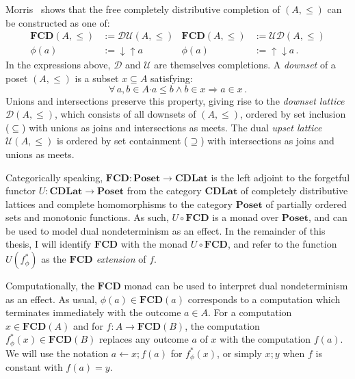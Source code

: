 \documentclass[draft,11pt]{report}
\newcommand{\bdot}{\boldsymbol{\cdot}}
\begin{document}
Morris~\citep{augtyp} shows that
the free completely distributive completion of $(A, \le)$
can be constructed as one of:
\begin{align*}
  \mathbf{FCD}(A, {\le}) &:= \mathcal{D} \mathcal{U}(A, {\le}) &
  \mathbf{FCD}(A, {\le}) &:= \mathcal{U} \mathcal{D}(A, {\le}) \\
  \phi(a) &:= {\downarrow}{\uparrow} a &
  \phi(a) &:= {\uparrow}{\downarrow} a \,.
\end{align*}
In the expressions above,
$\mathcal{D}$ and $\mathcal{U}$
are themselves completions.
A \emph{downset} of a poset $(A, {\le})$
is a subset $x \subseteq A$ satisfying:
\[
  \forall \, a, b \in A \bdot
          a \le b \wedge b \in x \Rightarrow a \in x \,.
\]
Unions and intersections preserve this property,
giving rise to the \emph{downset lattice} $\mathcal{D}(A, {\le})$,
which consists of all downsets of $(A, {\le})$,
ordered by set inclusion (${\subseteq}$) with
unions as joins and intersections as meets.
The dual \emph{upset lattice} $\mathcal{U}(A, {\le})$
is ordered by set containment (${\supseteq}$) with
intersections as joins and unions as meets.

Categorically speaking,
$\mathbf{FCD} : \mathbf{Poset} \rightarrow \mathbf{CDLat}$
is the left adjoint to the forgetful functor
$U : \mathbf{CDLat} \rightarrow \mathbf{Poset}$
from the category $\mathbf{CDLat}$
of completely distributive lattices and complete homomorphisms
to the category $\mathbf{Poset}$
of partially ordered sets and monotonic functions.
As such, $U \! \circ \mathbf{FCD}$ is a monad over $\mathbf{Poset}$,
and can be used to model dual nondeterminism
as an effect.
In the remainder of this thesis,
I will identify $\mathbf{FCD}$ with
the monad $U \! \circ \mathbf{FCD}$,
and refer to the function
$U(f_\phi^*)$ as the \emph{$\mathbf{FCD}$ extension} of $f$.

Computationally,
the $\mathbf{FCD}$ monad can be used to interpret
dual nondeterminism as an effect.
As usual,
$\phi(a) \in \mathbf{FCD}(a)$
corresponds to a computation which
terminates immediately with the outcome $a \in A$.
For a computation $x \in \mathbf{FCD}(A)$
and for $f : A \rightarrow \mathbf{FCD}(B)$,
the computation $f_\phi^*(x) \in \mathbf{FCD}(B)$
replaces
any outcome $a$ of $x$ with the computation $f(a)$.
We will use the notation
$a \leftarrow x ; f(a)$ for $f^*_\phi(x)$,
or simply $x ; y$ when $f$ is constant with $f(a) = y$.
\end{document}
